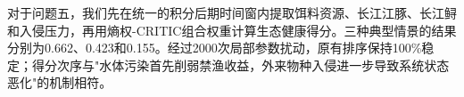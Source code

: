 对于问题五，我们先在统一的积分后期时间窗内提取饵料资源、长江江豚、长江鲟和入侵压力，再用熵权-CRITIC组合权重计算生态健康得分。三种典型情景的结果分别为0.662、0.423和0.155。经过2000次局部参数扰动，原有排序保持100\%稳定；得分次序与"水体污染首先削弱禁渔收益，外来物种入侵进一步导致系统状态恶化"的机制相符。
